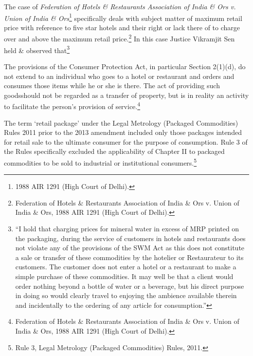 \begin{multicols}{2}
\noi
The case of \textit{Federation of Hotels \& Restaurants Association of India \& Ors v. Union of India \& Ors}\footnote{1988 AIR 1291 (High Court of Delhi).} specifically deals with subject matter of maximum retail price with reference to five star hotels and their right or lack there of to charge over and above the maximum retail price.\footnote{Federation of Hotels \& Restaurants Association of India \& Ors v. Union of India \& Ors, 1988 AIR 1291 (High Court of Delhi).} In this case Justice Vikramjit Sen held \& observed that\footnote{“I hold that charging prices for mineral water in excess of MRP printed on the packaging, during the service of customers in hotels and restaurants does not violate any of the provisions of the SWM Act as this does not constitute a sale or transfer of these commodities by the hotelier or Restaurateur to its customers. The customer does not enter a hotel or a restaurant to make a simple purchase of these commodities. It may well be that a client would order nothing beyond a bottle of water or a beverage, but his direct purpose in doing so would clearly travel to enjoying the ambience available therein and incidentally to the ordering of any article for consumption.”}

\vspace{-.15cm}

\noi
The provisions of the Consumer Protection Act, in particular Section 2(1)(d), do not extend to
an individual who goes to a hotel or restaurant and orders and consumes those items while he
or she is there. The act of providing such goodsshould not be regarded as a transfer of property,
but is in reality an activity to facilitate the person's provision of service.\footnote{Federation of Hotels \& Restaurants Association of India \& Ors v. Union of India \& Ors, 1988 AIR 1291 (High Court of Delhi).}

\vspace{-.15cm}

\noi
The term ‘retail package’ under the Legal Metrology (Packaged Commodities) Rules 2011
prior to the 2013 amendment included only those packages intended for retail sale to the
ultimate consumer for the purpose of consumption. Rule 3 of the Rules specifically excluded
the applicability of Chapter II to packaged commodities to be sold to industrial or institutional
consumers.\footnote{Rule 3, Legal Metrology (Packaged Commodities) Rules, 2011.}

\vspace{-.15cm}


\end{multicols}
